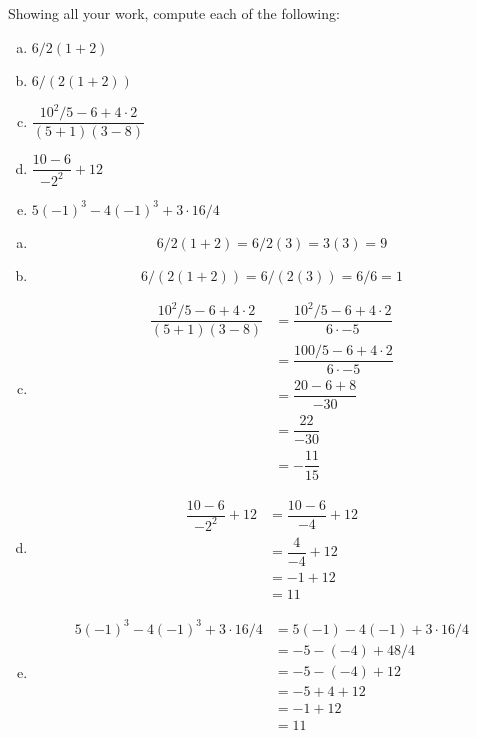 \documentclass[11pt,letterpaper]{article}
\begin{document}
\newpage



 Showing all your work, compute each of the following:
\begin{enumerate}[(a)]
\item $6/2(1 + 2)$
\item $6/(2(1+2))$
\item $\dfrac{10^2/5 - 6 + 4 \cdot 2}{(5 + 1)(3 - 8)}$
\item $\dfrac{10 - 6}{-2^2} + 12$
\item $5(-1)^3 - 4(-1)^3 + 3 \cdot 16/4$
\end{enumerate} \pspace

\sol
\begin{enumerate}[(a)]
\item 
	\[
	6/2(1 + 2)= 6/2(3)= 3(3)= 9
	\]

\item 
	\[
	6/(2(1+2))= 6/(2(3))= 6/6= 1
	\]

\item 
	\[
	\begin{aligned}
	\dfrac{10^2/5 - 6 + 4 \cdot 2}{(5 + 1)(3 - 8)}&= \dfrac{10^2/5 - 6 + 4 \cdot 2}{6 \cdot -5} \\
	&= \dfrac{100/5 - 6 + 4 \cdot 2}{6 \cdot -5} \\
	&= \dfrac{20 - 6 + 8}{-30} \\
	&= \dfrac{22}{-30} \\
	&= -\dfrac{11}{15}
	\end{aligned}
	\]

\item 
	\[
	\begin{aligned}
	\dfrac{10 - 6}{-2^2} + 12&= \dfrac{10 - 6}{-4} + 12 \\
	&= \dfrac{4}{-4} + 12 \\
	&= -1 + 12 \\
	&= 11
	\end{aligned}
	\]

\item 
	\[
	\begin{aligned}
	5(-1)^3 - 4(-1)^3 + 3 \cdot 16/4&= 5(-1) - 4(-1) + 3 \cdot 16/4 \\
	&= -5 - (-4) + 48/4 \\
	&= -5 - (-4) + 12 \\
	&= -5 + 4 + 12 \\
	&= -1 + 12 \\
	&= 11
	\end{aligned}
	\]
\end{enumerate}
\end{document}
